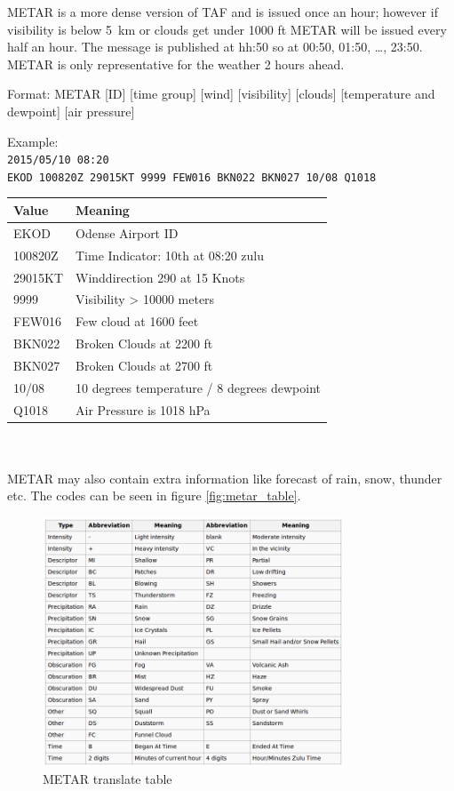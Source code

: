 METAR is a more dense version of TAF and is issued once an hour; however if visibility is below \SI{5}{\kilo\meter} or clouds get under 1000 ft METAR will be issued every half an hour. The message is published at hh:50 so at 00:50, 01:50, \ldots , 23:50. METAR is only representative for the weather 2 hours ahead.

Format:
METAR [ID] [time group] [wind] [visibility] [clouds] [temperature and dewpoint] [air pressure]

Example:\\
\verb|2015/05/10 08:20|\\
\verb|EKOD 100820Z 29015KT 9999 FEW016 BKN022 BKN027 10/08 Q1018|

\begin{tabular}{ll}
	\toprule
	\textbf{Value} & \textbf{Meaning}                            \\\midrule
	EKOD           & Odense Airport ID                           \\
	100820Z        & Time Indicator: 10th at 08:20 zulu          \\
	29015KT        & Winddirection 290 at 15 Knots               \\
	9999           & Visibility > 10000 meters                   \\
	FEW016         & Few cloud at 1600 feet                      \\
	BKN022         & Broken Clouds at 2200 ft                    \\
	BKN027         & Broken Clouds at 2700 ft                    \\
	10/08          & 10 degrees temperature / 8 degrees dewpoint \\
	Q1018          & Air Pressure is 1018 hPa                    \\\bottomrule
\end{tabular}
~\\~\\
METAR may also contain extra information like forecast of rain, snow, thunder etc. The codes can be seen in figure \vref{fig:metar_table}.

\begin{figure}
	\centering
	\includegraphics[width=0.8\textwidth]{imgs/metar_table}
	\caption{METAR translate table}
	\label{fig:metar_table}
\end{figure}

